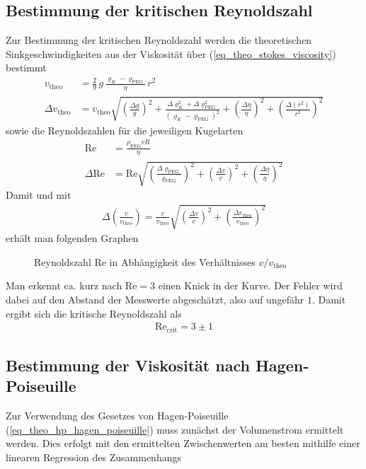 \documentclass[12pt,a4paper,german]{scrartcl}
\numberwithin{equation}{section}
\begin{document}
  \subsection{Bestimmung der kritischen Reynoldszahl}
  Zur Bestimmung der kritischen Reynoldszahl werden die \glqq theoretischen\grqq{} Sinkgeschwindigkeiten aus der Viskosität über (\ref{eq_theo_stokes_viscosity}) bestimmt
  \begin{align}
    v_\text{theo} &= \frac{2}{9} \, g \, \frac{\varrho_K - \varrho_\text{PEG}}{\eta} \, r^2 \nonumber \\
    \Delta v_\text{theo} &= v_\text{theo} \sqrt{\left(\frac{\Delta g}{g}\right)^2 + \frac{\Delta\varrho_K^2 + \Delta\varrho_\text{PEG}^2}{(\varrho_K - \varrho_\text{PEG})^2} + \left(\frac{\Delta\eta}{\eta}\right)^2 + \left(\frac{\Delta (r^2)}{r^2}\right)^2}
  \end{align}
  sowie die Reynoldszahlen für die jeweiligen Kugelarten
  \begin{align}
    \text{Re} &= \frac{\rho_\text{PEG} v R}{\eta} \nonumber \\
    \Delta \text{Re} &= \text{Re} \sqrt{\left(\frac{\Delta \varrho_\text{PEG}}{\varrho_\text{PEG}}\right)^2 + \left(\frac{\Delta v}{v}\right)^2 + \left(\frac{\Delta\eta}{\eta}\right)^2}
  \end{align}
  Damit und mit
  \begin{align}
    \Delta \left(\frac{v}{v_\text{theo}} \right) = \frac{v}{v_\text{theo}} \sqrt{\left(\frac{\Delta v}{v}\right)^2 + \left(\frac{\Delta v_\text{theo}}{v_\text{theo}}\right)^2}
  \end{align}
  erhält man folgenden Graphen
  \begin{figure}[h]
    \centering
    \resizebox{\textwidth}{!}{
      
    }
    \caption{Reynoldszahl Re in Abhängigkeit des Verhältnisses $v / v_\text{theo}$}
    \label{fig_reynolds}
  \end{figure}
  Man erkennt ca. kurz nach $\text{Re} = 3$ einen Knick in der Kurve. Der Fehler wird dabei auf den Abstand der Messwerte abgeschätzt, also auf ungefähr $1$. Damit ergibt sich die kritische Reynoldszahl als
  \begin{align}
    \text{Re}_\text{crit} = 3 \pm 1
  \end{align}

  \subsection{Bestimmung der Viskosität nach Hagen-Poiseuille}
  Zur Verwendung des Gesetzes von Hagen-Poiseuille (\ref{eq_theo_hp_hagen_poiseuille}) muss zunächst der Volumenstrom ermittelt werden.
  Dies erfolgt mit den ermittelten Zwischenwerten am besten mithilfe einer linearen Regression des Zusammenhangs
\end{document}
